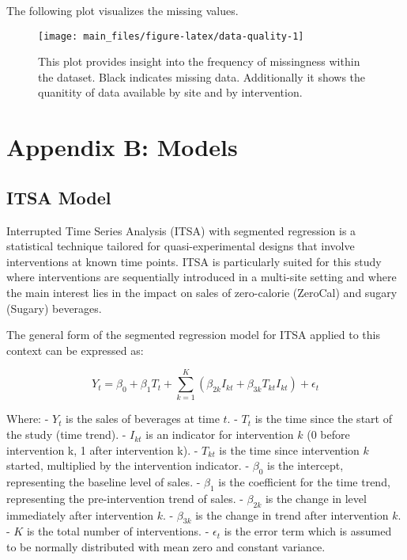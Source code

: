 \documentclass[
]{article}
\begin{document}
The following plot visualizes the missing values.

\begin{figure}

{\centering \texttt{[image: main\_files/figure-latex/data-quality-1]} 

}

\caption{This plot provides insight into the frequency of missingness within the dataset. Black indicates missing data. Additionally it shows the quanitity of data available by site and by intervention.}\label{fig:data-quality}
\end{figure}

\pagebreak

\hypertarget{appendix-b-models}{%
\section{Appendix B: Models}\label{appendix-b-models}}

\hypertarget{itsa-model}{%
\subsection{ITSA Model}\label{itsa-model}}

Interrupted Time Series Analysis (ITSA) with segmented regression is a statistical technique tailored for quasi-experimental designs that involve interventions at known time points. ITSA is particularly suited for this study where interventions are sequentially introduced in a multi-site setting and where the main interest lies in the impact on sales of zero-calorie (ZeroCal) and sugary (Sugary) beverages.

The general form of the segmented regression model for ITSA applied to this context can be expressed as:

\[Y_t = \beta_0 + \beta_1 T_t + \sum_{k=1}^{K} (\beta_{2k} I_{kt} + \beta_{3k} T_{kt} I_{kt}) + \epsilon_t \]

Where:
- \(Y_t\) is the sales of beverages at time \(t\).
- \(T_t\) is the time since the start of the study (time trend).
- \(I_{kt}\) is an indicator for intervention \(k\) (0 before intervention k, 1 after intervention k).
- \(T_{kt}\) is the time since intervention \(k\) started, multiplied by the intervention indicator.
- \(\beta_0\) is the intercept, representing the baseline level of sales.
- \(\beta_1\) is the coefficient for the time trend, representing the pre-intervention trend of sales.
- \(\beta_{2k}\) is the change in level immediately after intervention \(k\).
- \(\beta_{3k}\) is the change in trend after intervention \(k\).
- \(K\) is the total number of interventions.
- \(\epsilon_t\) is the error term which is assumed to be normally distributed with mean zero and constant variance.
\end{document}
